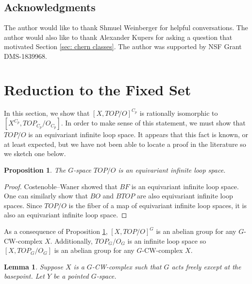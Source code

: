 \documentclass[11pt, twoside]{amsart}
\theoremstyle{plain}
\newtheorem{lemma}[theorem]{Lemma}
\newtheorem{prop}[theorem]{Proposition}
\theoremstyle{definition}
\theoremstyle{remark}
\begin{document}
\subsection{Acknowledgments}
The author would like to thank Shmuel Weinberger for helpful conversations.
The author would also like to thank Alexander Kupers for asking a question that motivated Section \ref{sec: chern classes}.
The author was supported by NSF Grant DMS-1839968.

\section{Reduction to the Fixed Set}
In this section, we show that $[X,TOP/O]^{C_p}$ is rationally isomorphic to $[X^{C_p}, TOP_{C_p}/ O_{C_p}]$.
In order to make sense of this statement, we must show that $ TOP/ O$ is an equivariant infinite loop space.
It appears that this fact is known, or at least expected, but we have not been able to locate a proof in the literature so we sketch one below.

\begin{prop}\label{prop: TOP/O equivariant infinite loop space}
The $G$-space $ TOP/ O$ is an equivariant infinite loop space.
\end{prop}
\begin{proof}
Costenoble--Waner \cite{CostenobleWaner} showed that $BF$ is an equivariant infinite loop space.
One can similarly show that $BO$ and $BTOP$ are also equivariant infinite loop spaces.
Since $TOP/O$ is the fiber of a map of equivariant infinite loop spaces, it is also an equivariant infinite loop space.
\end{proof}

As a consequence of Proposition \ref{prop: TOP/O equivariant infinite loop space}, $[X,TOP/O]^G$ is an abelian group for any $G$-CW-complex $X$.
Additionally, $ TOP_G/ O_G$ is an infinite loop space so $[X, TOP_G/ O_G]$ is an abelian group for any $G$-CW-complex $X$.

\begin{lemma}\label{lem: transfer}
Suppose $X$ is a $G$-CW-complex such that $G$ acts freely except at the basepoint.
Let $Y$ be a pointed $G$-space.
\end{lemma}
\end{document}
